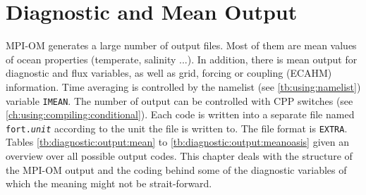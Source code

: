 %
%



\thispagestyle{empty}
 
\chapter[Diagnostic and Mean Output]
{\Large{\bf Diagnostic and Mean Output}}
\label{ch:diagnostic}



MPI-OM generates a large number of output files. Most of them are mean values of ocean properties (temperate, salinity ...). 
In addition, there is mean output for diagnostic and flux variables, as well as grid, forcing or coupling (ECAHM) information.
Time averaging is controlled by the namelist (see \ref{tb:using:namelist}) variable \texttt{IMEAN}.
The number of output can be controlled with CPP switches (see \ref{ch:using:compiling:conditional}).
Each code is written into a separate file named \texttt{fort.}\textit{\texttt{unit}} according to the unit the file is written to. 
The file format is \texttt{EXTRA}. 
Tables \ref{tb:diagnostic:output:mean} to \ref{tb:diagnostic:output:meanoasis} given an overview over all possible output codes.
This chapter deals with the structure of the MPI-OM output and the coding behind
some of the diagnostic variables of which the meaning might not be strait-forward. 


